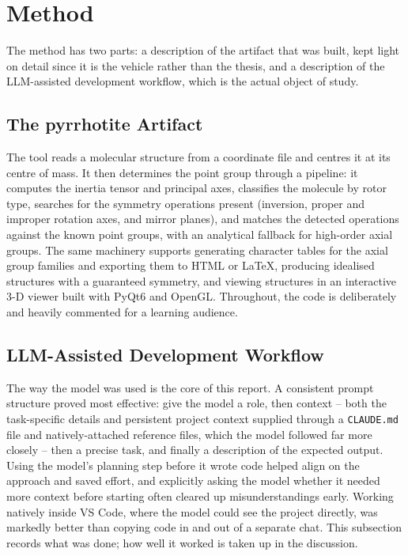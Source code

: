 \documentclass[11pt, a4paper]{article}
\begin{document}
\section{Method}
The method has two parts: a description of the artifact that was built, kept light on
detail since it is the vehicle rather than the thesis, and a description of the
LLM-assisted development workflow, which is the actual object of study.

\subsection{The pyrrhotite Artifact}
The tool reads a molecular structure from a coordinate file and centres it at its
centre of mass. It then determines the point group through a pipeline: it computes the
inertia tensor and principal axes, classifies the molecule by rotor type, searches for
the symmetry operations present (inversion, proper and improper rotation axes, and
mirror planes), and matches the detected operations against the known point groups,
with an analytical fallback for high-order axial groups. The same machinery supports
generating character tables for the axial group families and exporting them to HTML or
LaTeX, producing idealised structures with a guaranteed symmetry, and viewing
structures in an interactive 3-D viewer built with PyQt6 and OpenGL. Throughout, the
code is deliberately and heavily commented for a learning audience.

\subsection{LLM-Assisted Development Workflow}
The way the model was used is the core of this report. A consistent prompt structure
proved most effective: give the model a role, then context -- both the task-specific
details and persistent project context supplied through a \texttt{CLAUDE.md} file and
natively-attached reference files, which the model followed far more closely -- then a
precise task, and finally a description of the expected output. Using the model's
planning step before it wrote code helped align on the approach and saved effort, and
explicitly asking the model whether it needed more context before starting often
cleared up misunderstandings early. Working natively inside VS Code, where the model
could see the project directly, was markedly better than copying code in and out of a
separate chat. This subsection records what was done; how well it worked is taken up in
the discussion.
\end{document}
